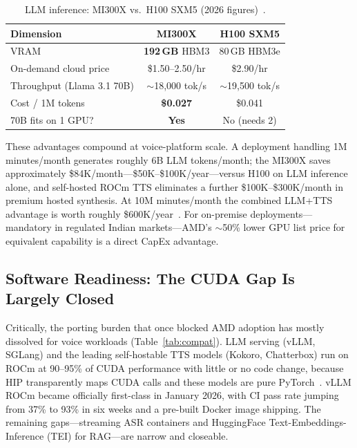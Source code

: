 \documentclass[blind]{gtac}
\begin{document}
\begin{table}[H]
\centering
\caption{LLM inference: MI300X vs.\ H100 SXM5 (2026 figures)~\cite{spheron_rocm,vllm_rocm}.}
\label{tab:llm}
\tiny
\begin{tabular}{@{}lcc@{}}
\toprule
Dimension & MI300X & H100 SXM5 \\
\midrule
VRAM & \textbf{192\,GB} HBM3 & 80\,GB HBM3e \\
On-demand cloud price & \$1.50--2.50/hr & \$2.90/hr \\
Throughput (Llama 3.1 70B) & $\sim$18{,}000 tok/s & $\sim$19{,}500 tok/s \\
Cost / 1M tokens & \textbf{\$0.027} & \$0.041 \\
70B fits on 1 GPU? & \textbf{Yes} & No (needs 2) \\
\bottomrule
\end{tabular}
\end{table}

These advantages compound at voice-platform scale. A deployment handling 1M minutes/month generates roughly 6B LLM tokens/month; the MI300X saves approximately \$84K/month---\$50K--\$100K/year---versus H100 on LLM inference alone, and self-hosted ROCm TTS eliminates a further \$100K--\$300K/month in premium hosted synthesis. At 10M minutes/month the combined LLM+TTS advantage is worth roughly \$600K/year~\cite{spheron_rocm,vllm_rocm,bentoml_tts}. For on-premise deployments---mandatory in regulated Indian markets---AMD's $\sim$50\% lower GPU list price for equivalent capability is a direct CapEx advantage.

\subsection{Software Readiness: The CUDA Gap Is Largely Closed}

Critically, the porting burden that once blocked AMD adoption has mostly dissolved for voice workloads (Table~\ref{tab:compat}). LLM serving (vLLM, SGLang) and the leading self-hostable TTS models (Kokoro, Chatterbox) run on ROCm at 90--95\% of CUDA performance with little or no code change, because HIP transparently maps CUDA calls and these models are pure PyTorch~\cite{vllm_rocm,bentoml_tts}. vLLM ROCm became officially first-class in January 2026, with CI pass rate jumping from 37\% to 93\% in six weeks and a pre-built Docker image shipping. The remaining gaps---streaming ASR containers and HuggingFace Text-Embeddings-Inference (TEI) for RAG---are narrow and closeable.
\end{document}
